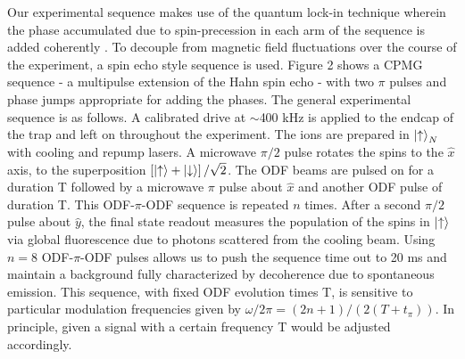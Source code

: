 \documentclass[aps,prl,twocolumn,superscriptaddress,floatfix]{revtex4-1}
\begin{document}
Our experimental sequence makes use of the quantum lock-in technique wherein the phase accumulated due to spin-precession in each arm of the sequence is added coherently \citep{Kotler2011}. To decouple from magnetic field fluctuations over the course of the experiment, a spin echo style sequence is used. Figure 2 shows a CPMG sequence - a multipulse extension of the Hahn spin echo - with two $\pi$ pulses and phase jumps appropriate for adding the phases. The general experimental sequence is as follows. A calibrated drive at $\sim$400 kHz is applied to the endcap of the trap and left on throughout the experiment. The ions are prepared in $\ket{\uparrow}_N$ with cooling and repump lasers. A microwave $\pi/2$ pulse rotates the spins to the $\hat{x}$ axis, to the superposition $\left[\ket{\uparrow} + \ket{\downarrow}\right]/\sqrt{2}$. The ODF beams are pulsed on for a duration T followed by a microwave $\pi$ pulse about $\hat{x}$ and another ODF pulse of duration T. This ODF-$\pi$-ODF sequence is repeated $n$ times. After a second $\pi/2$ pulse about $\hat{y}$, the final state readout measures the population of the spins in $\ket{\uparrow}$ via global fluorescence due to photons scattered from the cooling beam. Using $n = 8$ ODF-$\pi$-ODF pulses allows us to push the sequence time out to 20 ms and maintain a background fully characterized by decoherence due to spontaneous emission. This sequence, with fixed ODF evolution times T, is sensitive to particular modulation frequencies given by $ \omega/2\pi = (2n+1)/(2(T+t_{\pi}))$. In principle, given a signal with a certain frequency T would be adjusted accordingly.
\iffalse
\end{document}
